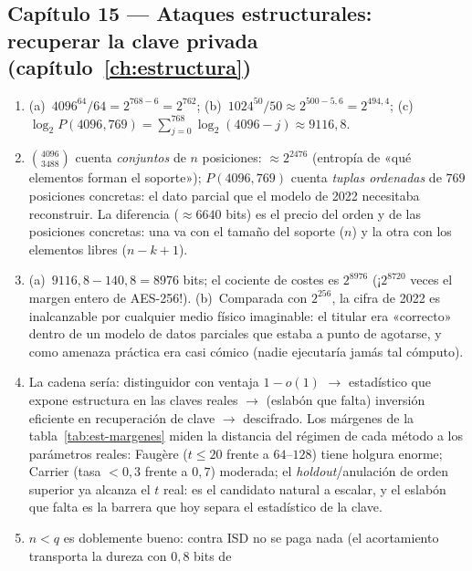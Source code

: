 \documentclass[11pt,a4paper,oneside]{report}
\begin{document}
\subsection*{Capítulo 15 --- Ataques estructurales: recuperar la
clave privada (capítulo~\ref{ch:estructura})}

\begin{enumerate}[leftmargin=1.9em,itemsep=4pt]
  \item (a)~$4096^{64}/64=2^{768-6}=2^{762}$;
        (b)~$1024^{50}/50\approx2^{500-5{,}6}=2^{494{,}4}$;
        (c)~$\log_2P(4096,769)=\sum_{j=0}^{768}\log_2(4096-j)
        \approx9116{,}8$.
  \item $\binom{4096}{3488}$ cuenta \emph{conjuntos} de $n$
        posiciones: $\approx2^{2476}$ (entropía de «qué elementos
        forman el soporte»); $P(4096,769)$ cuenta \emph{tuplas
        ordenadas} de $769$ posiciones concretas: el dato parcial
        que el modelo de 2022 necesitaba reconstruir. La diferencia
        ($\approx6640$ bits) es el precio del orden y de las
        posiciones concretas: una va con el tamaño del soporte
        ($n$) y la otra con los elementos libres ($n-k+1$).
  \item (a)~$9116{,}8-140{,}8=8976$ bits; el cociente de costes es
        $2^{8976}$ (¡$2^{8720}$ veces el margen entero de
        AES-256!). (b)~Comparada con $2^{256}$, la cifra de 2022 es
        inalcanzable por cualquier medio físico imaginable: el
        titular era «correcto» dentro de un modelo de datos
        parciales que estaba a punto de agotarse, y como amenaza
        práctica era casi cómico (nadie ejecutaría jamás tal
        cómputo).
  \item La cadena sería: distinguidor con ventaja $1-o(1)$
        $\to$ estadístico que expone estructura en las claves
        reales $\to$ (eslabón que falta) inversión eficiente en
        recuperación de clave $\to$ descifrado. Los márgenes de
        la tabla~\ref{tab:est-margenes} miden la distancia del régimen de
        cada método a los parámetros reales: Faugère ($t\le20$
        frente a $64$--$128$) tiene holgura enorme; Carrier
        (tasa $<0{,}3$ frente a $0{,}7$) moderada; el
        \emph{holdout}/anulación de orden superior ya alcanza el
        $t$ real: es el candidato natural a escalar, y el eslabón
        que falta es la barrera que hoy separa el estadístico de
        la clave.
  \item $n<q$ es doblemente bueno: contra ISD no se paga nada
        (el acortamiento transporta la dureza con $0{,}8$ bits de

\end{enumerate}
\end{document}
